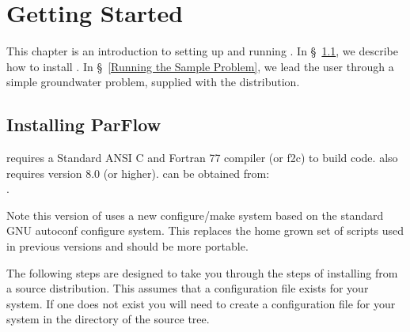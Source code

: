 
\chapter{Getting Started}
\label{Getting Started}

This chapter is an introduction to setting up and running \parflow{}.
In \S~\ref{Installing ParFlow}, we describe how to install \parflow{}.
In \S~\ref{Running the Sample Problem}, we lead the user through a
simple groundwater problem, supplied with the \parflow{} distribution.


\section{Installing ParFlow}
\label{Installing ParFlow}

\parflow{} requires a Standard ANSI C and Fortran 77 compiler (or f2c)
to build code.  \parflow{} also requires  version 8.0 (or
higher).   can be obtained from:
\\ .

Note this version of \parflow{} uses a new configure/make system based on
the standard GNU autoconf configure system.  This replaces the home
grown set of scripts used in previous versions and should be more
portable.

The following steps are designed to take you through the steps of
installing \parflow{} from a source distribution.  This assumes that 
a configuration file exists for your system.  If one does not exist
you will need to create a configuration file for your system in
the  directory of the \parflow{} source tree.

